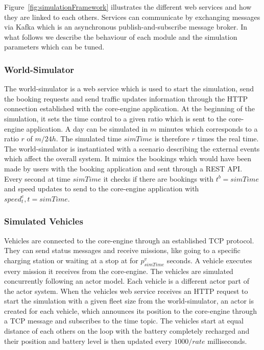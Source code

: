 \documentclass[12pt,a4paper]{article}
\begin{document}
Figure~\ref{fig:simulationFramework} illustrates the different web services and how they are linked to each others. Services can communicate by exchanging messages via Kafka which is an asynchronous publish-and-subscribe message broker. In what follows we describe the behaviour of each module and the simulation parameters which can be tuned. 

\subsubsection{World-Simulator}
The world-simulator is a web service which is used to start the simulation, send the booking requests and send traffic updates information through the HTTP connection established with the core-engine application. At the beginning of the simulation, it sets the time control to a given ratio which is sent to the core-engine application.  A day can be simulated in $m$ minutes which corresponds to a ratio $r$ of $m / 24h$. The simulated time $simTime$ is therefore $r$ times the real time. The world-simulator is instantiated with a scenario describing the external events which affect the overall system. It mimics the bookings which would have been made by users with the booking application and sent through a REST API. Every second at time $simTime$ it checks if there are bookings with $t^{b} = simTime$ and speed updates to send to the core-engine application with $speed_{t}^{e}, t = simTime$. 

\subsubsection{Simulated Vehicles}
Vehicles are connected to the core-engine through an established TCP protocol. They can send status messages and receive missions, like going to a specific charging station or waiting at a stop at for $p^{v}_{simTime}$ seconds. A vehicle executes every mission it receives from the core-engine. The vehicles are simulated concurrently following an actor model. Each vehicle is a different actor part of the actor system. When the vehicles web service receives an HTTP request to start the simulation with a given fleet size from the world-simulator, an actor is created for each vehicle, which announces its position to the core-engine through a TCP message and subscribes to the time topic. The vehicles start at equal distance of each others on the loop with the battery completely recharged and their position and battery level is then updated every $1000/rate$ milliseconds.  
\end{document}
